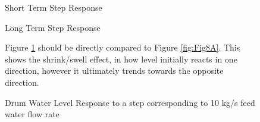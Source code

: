         \begin{figure}[ht]
            \begin{center}
                
                Short Term Step Response
                
                
                Long Term Step Response
                
                \caption{Drum Water Level Response to a step corresponding to 10 kg/s feed water flow rate}
                \label{fig:Valve_Open2A}
            \end{center}
            Figure \ref{fig:Valve_Open2A} should be directly compared to Figure \ref{fig:Fig8A}. This shows the shrink/swell effect, in how level initially reacts in one direction, however it ultimately trends towards the opposite direction.
        \end{figure}  %
        
